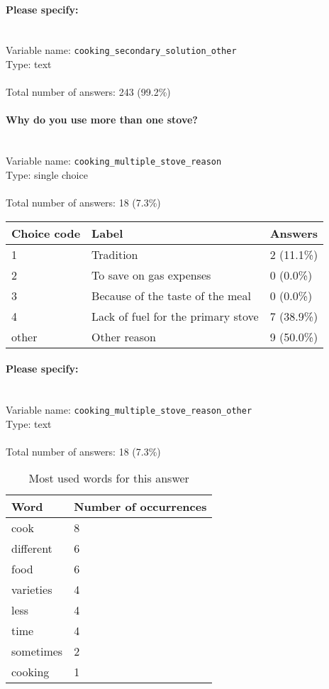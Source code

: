 \documentclass[11.5pt, a4paper]{scrartcl}
\begin{document}
\paragraph{Please specify:}
\  \\Variable name: \texttt{cooking\_secondary\_solution\_other}\\
Type: text\\
\\Total number of answers: 243 (99.2\%)
\\[0.2em]\paragraph{Why do you use more than one stove?}
\  \\Variable name: \texttt{cooking\_multiple\_stove\_reason}\\
Type: single choice\\
\\Total number of answers: 18 (7.3\%)
\\[0.2em] \begin{tabular}{p{4cm}|p{8cm}|p{3cm}}
Choice code & Label & Answers \\
\hline
1 & Tradition & \cellcolor{color0}2 (11.1\%)\\
\cellcolor{mygray} 2 & \cellcolor{mygray}To save on gas expenses & \cellcolor{color0}0 (0.0\%)\\
3 & Because of the taste of the meal& \cellcolor{color0}0 (0.0\%)\\
\cellcolor{mygray} 4 & \cellcolor{mygray}Lack of fuel for the primary stove & \cellcolor{color1}7 (38.9\%)\\
other & Other reason& \cellcolor{color2}9 (50.0\%)\\
\end{tabular}
\paragraph{Please specify:}
\  \\Variable name: \texttt{cooking\_multiple\_stove\_reason\_other}\\
Type: text\\
\\Total number of answers: 18 (7.3\%)
\\[0.2em]\begin{table}[H]
 \begin{tabular}{p{4cm}|p{8cm}}
Word & Number of occurrences  \\
\hline
\cellcolor{mygray}cook&\cellcolor{mygray}8\\
\hline
different&6\\
\hline
\cellcolor{mygray}food&\cellcolor{mygray}6\\
\hline
varieties&4\\
\hline
\cellcolor{mygray}less&\cellcolor{mygray}4\\
\hline
time&4\\
\hline
\cellcolor{mygray}sometimes&\cellcolor{mygray}2\\
\hline
cooking&1\\
\hline
\end{tabular}
\caption{\label{tab:table-name} Most used words for this answer}
\end{table}
\end{document}
